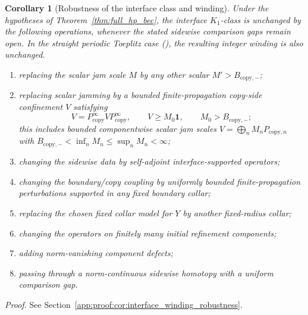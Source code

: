 \documentclass[11pt]{article}
\numberwithin{equation}{section}
\newtheorem{corollary}[theorem]{Corollary}
\theoremstyle{definition}
\theoremstyle{remark}
\newcommand{\proofref}[1]{%
  \par\noindent\emph{Proof.} See Section~\ref{#1}.\par\medskip
}
\newcommand{\proofappendixref}[1]{\proofref{#1}}
\newcommand{\Id}{\mathbf{1}}
\begin{document}
\begin{corollary}[Robustness of the interface class and winding]\label{cor:interface_winding_robustness}
Under the hypotheses of Theorem~\ref{thm:full_hp_bec}, the interface \(K_1\)-class is
unchanged by the following operations, whenever the stated sidewise comparison gaps remain
open. In the straight periodic Toeplitz case (), the resulting
integer winding is also unchanged.
\begin{enumerate}[label=(\alph*),leftmargin=2em]
\item replacing the scalar jam scale \(M\) by any other scalar \(M'>B_{\mathrm{copy},-}\);
\item replacing scalar jamming by a bounded finite-propagation copy-side confinement \(V\)
  satisfying
  \[
  V=P_{\mathrm{copy}}^\infty V P_{\mathrm{copy}}^\infty,\qquad
  V\ge M_0\Id,\qquad M_0>B_{\mathrm{copy},-};
  \]
  this includes bounded componentwise scalar jam scales \(V=\bigoplus_n M_nP_{\mathrm{copy},n}\)
  with \(B_{\mathrm{copy},-}<\inf_nM_n\le\sup_nM_n<\infty\);
\item changing the sidewise data by self-adjoint interface-supported operators;
\item changing the boundary/copy coupling by uniformly bounded finite-propagation perturbations
  supported in any fixed boundary collar;
\item replacing the chosen fixed collar model for \(Y\) by another fixed-radius collar;
\item changing the operators on finitely many initial refinement components;
\item adding norm-vanishing component defects;
\item passing through a norm-continuous sidewise homotopy with a uniform comparison gap.
\end{enumerate}
\end{corollary}
\proofappendixref{app:proof:cor:interface_winding_robustness}
\end{document}
